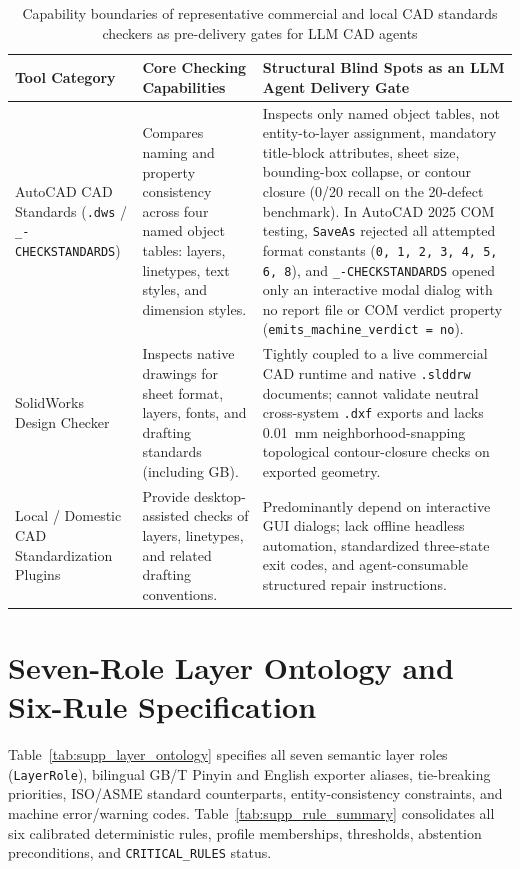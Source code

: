 \documentclass[nocopyright,nolists,upint,varvw,hyphenate]{asmejour}
\begin{document}
\begin{table}[t]
\caption{Capability boundaries of representative commercial and local CAD standards checkers as pre-delivery gates for LLM CAD agents}\label{tab:supp_commercial}
\centering
\footnotesize
{}%
\begin{tabularx}{\textwidth}{L{4.0cm} L{4.6cm} Y}
\toprule
Tool Category & Core Checking Capabilities & Structural Blind Spots as an LLM Agent Delivery Gate \\
\midrule
AutoCAD CAD Standards (\texttt{.dws} / \texttt{\_-CHECKSTANDARDS}) &
Compares naming and property consistency across four named object tables: layers, linetypes, text styles, and dimension styles. &
Inspects only named object tables, not entity-to-layer assignment, mandatory title-block attributes, sheet size, bounding-box collapse, or contour closure (0/20 recall on the 20-defect benchmark). In AutoCAD 2025 COM testing, \texttt{SaveAs} rejected all attempted format constants (\texttt{0, 1, 2, 3, 4, 5, 6, 8}), and \texttt{\_-CHECKSTANDARDS} opened only an interactive modal dialog with no report file or COM verdict property (\texttt{emits\_machine\_verdict = no}). \\
\addlinespace[4pt]
SolidWorks Design Checker &
Inspects native drawings for sheet format, layers, fonts, and drafting standards (including GB). &
Tightly coupled to a live commercial CAD runtime and native \texttt{.slddrw} documents; cannot validate neutral cross-system \texttt{.dxf} exports and lacks 0.01~mm neighborhood-snapping topological contour-closure checks on exported geometry. \\
\addlinespace[4pt]
Local / Domestic CAD Standardization Plugins &
Provide desktop-assisted checks of layers, linetypes, and related drafting conventions. &
Predominantly depend on interactive GUI dialogs; lack offline headless automation, standardized three-state exit codes, and agent-consumable structured repair instructions. \\
\bottomrule
\end{tabularx}
\end{table}

\section{Seven-Role Layer Ontology and Six-Rule Specification}\label{sec:supp_rules}

Table~\ref{tab:supp_layer_ontology} specifies all seven semantic layer roles (\texttt{LayerRole}), bilingual GB/T Pinyin and English exporter aliases, tie-breaking priorities, ISO/ASME standard counterparts, entity-consistency constraints, and machine error/warning codes. Table~\ref{tab:supp_rule_summary} consolidates all six calibrated deterministic rules, profile memberships, thresholds, abstention preconditions, and \texttt{CRITICAL\_RULES} status.
\end{document}
